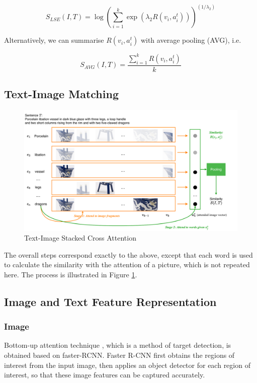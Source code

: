 $$
S_{L S E}(I, T)=\log \left(\sum_{i=1}^{k} \exp \left(\lambda_{2} R\left(v_{i}, a_{i}^{t}\right)\right)\right)^{\left(1 / \lambda_{2}\right)}
$$

Alternatively, we can
summarise $R\left(v_{i}, a_{i}^{t}\right)$ with average pooling (AVG), i.e.

$$
S_{A V G}(I, T)=\frac{\sum_{i=1}^{k} R\left(v_{i}, a_{i}^{t}\right)}{k}
$$

\subsection{Text-Image Matching}

\begin{figure}[h!]
\centering
\includegraphics[width=1\textwidth]{scan2.pdf}
\caption{Text-Image Stacked Cross Attention}
\label{fig:scan2}
\end{figure}

The overall steps correspond exactly to the above, except that each word is used to calculate the similarity with the attention of a picture, which is not repeated here. The process is illustrated in Figure \ref{fig:scan2}.

\subsection{Image and Text Feature Representation}

\subsubsection{Image}Bottom-up attention technique \cite{bottomup}, which is a method of target detection, is obtained based on faster-RCNN. Faster R-CNN first obtains the regions of interest from the input image, then applies an object detector for each region of interest, so that these image features can be captured accurately.

